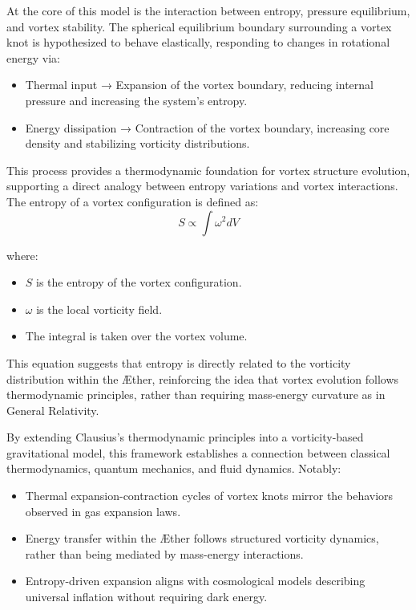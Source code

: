 \documentclass[a4paper,10pt]{article}
\begin{document}
    At the core of this model is the interaction between entropy, pressure equilibrium, and vortex stability. The spherical equilibrium boundary surrounding a vortex knot is hypothesized to behave elastically, responding to changes in rotational energy via:
    \begin{itemize}
        \item Thermal input → Expansion of the vortex boundary, reducing internal pressure and increasing the system’s entropy.
        \item Energy dissipation → Contraction of the vortex boundary, increasing core density and stabilizing vorticity distributions.
    \end{itemize}


    This process provides a thermodynamic foundation for vortex structure evolution, supporting a direct analogy between entropy variations and vortex interactions. The entropy of a vortex configuration is defined as:
    \begin{equation} \label{eq:Entropy}
        S \propto \int \omega^2 dV
    \end{equation}


    where:

    \begin{itemize}
        \item \( S \) is the entropy of the vortex configuration.
        \item \( \omega \)  is the local vorticity field.
        \item The integral is taken over the vortex volume.
    \end{itemize}

    This equation suggests that entropy is directly related to the vorticity distribution within the Æther, reinforcing the idea that vortex evolution follows thermodynamic principles, rather than requiring mass-energy curvature as in General Relativity.

    By extending Clausius’s thermodynamic principles into a vorticity-based gravitational model, this framework establishes a connection between classical thermodynamics, quantum mechanics, and fluid dynamics. Notably:

    \begin{itemize}
        \item Thermal expansion-contraction cycles of vortex knots mirror the behaviors observed in gas expansion laws.
        \item Energy transfer within the Æther follows structured vorticity dynamics, rather than being mediated by mass-energy interactions.
        \item Entropy-driven expansion aligns with cosmological models describing universal inflation without requiring dark energy.
    \end{itemize}
\end{document}

